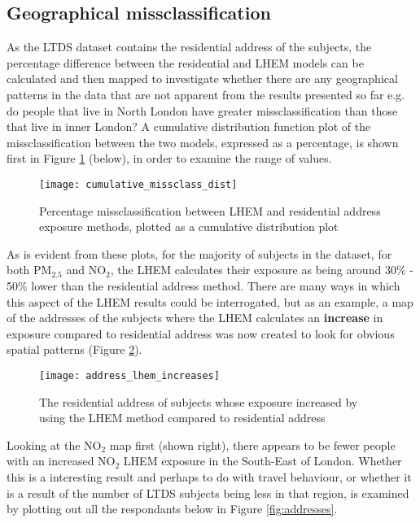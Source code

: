 \subsection{Geographical missclassification}
\label{subsec:geographical_missclassification}

As the LTDS dataset contains the residential address of the subjects, the percentage difference between the residential and LHEM models can be calculated and then mapped to investigate whether there are any geographical patterns in the data that are not apparent from the results presented so far e.g. do people that live in North London have greater missclassification than those that live in inner London? A cumulative distribution function plot of the missclassification between the two models, expressed as a percentage, is shown first in Figure \ref{fig:cumulative_missclass_dist} (below), in order to examine the range of values.

\begin{figure}[H]
\centering
\texttt{[image: cumulative\_missclass\_dist]}
\caption{Percentage missclassification between LHEM and residential address exposure methods, plotted as a cumulative distribution plot}
\label{fig:cumulative_missclass_dist}
\end{figure}

As is evident from these plots, for the majority of subjects in the dataset, for both PM$_{2.5}$ and NO$_{2}$, the LHEM calculates their exposure as being around 30\% - 50\% lower than the residential address method. There are many ways in which this aspect of the LHEM results could be interrogated, but as an example, a map of the addresses of the subjects where the LHEM calculates an \textbf{increase} in exposure compared to residential address was now created to look for obvious spatial patterns (Figure \ref{fig:address_lhem_increases}).

\begin{figure}[H]
\centering
\texttt{[image: address\_lhem\_increases]}
\caption{The residential address of subjects whose exposure increased by using the LHEM method compared to residential address}
\label{fig:address_lhem_increases}
\end{figure}

Looking at the NO$_{2}$ map first (shown right), there appears to be fewer people with an increased NO$_{2}$ LHEM exposure in the South-East of London. Whether this is a interesting result and perhaps to do with travel behaviour, or whether it is a result of the number of LTDS subjects being less in that region, is examined by plotting out all the respondants below in Figure \ref{fig:addresses}.

